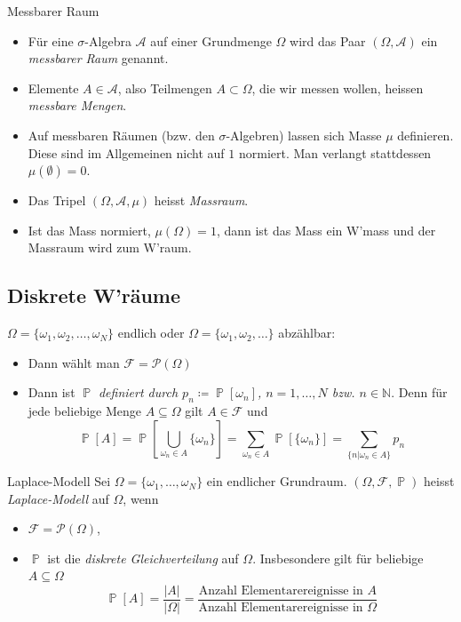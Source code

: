 \documentclass[a4paper,10pt]{article}
\def\N{\mathbb{N}}
\def\F{\mathcal{F}}
\renewcommand{\P}{\operatorname{\mathbb{P}}}
\numberwithin{equation}{section}
\begin{document}
\begin{subbox}{Messbarer Raum}
    \begin{itemize}
        \item Für eine \( \sigma \)-Algebra \( \mathcal{A} \) auf einer Grundmenge \( \Omega \) wird das Paar \( (\Omega, \mathcal{A}) \) ein \emph{messbarer Raum} genannt.
        \item Elemente \( A \in \mathcal{A} \), also Teilmengen \( A \subset \Omega \), die wir messen wollen, heissen \emph{messbare Mengen}.
        \item Auf messbaren Räumen (bzw. den \( \sigma \)-Algebren) lassen sich Masse \( \mu \) definieren. Diese sind im Allgemeinen nicht auf \( 1 \) normiert. Man verlangt stattdessen \( \mu(\emptyset) = 0 \).
        \item Das Tripel \( (\Omega, \mathcal{A}, \mu) \) heisst \emph{Massraum}.
        \item Ist das Mass normiert, \( \mu(\Omega) = 1 \), dann ist das Mass ein W'mass und der Massraum wird zum W'raum.
    \end{itemize}
\end{subbox}

\subsection{Diskrete W'räume}

\( \Omega = \{ \omega_1, \omega_2, \dots, \omega_N \} \) endlich oder \( \Omega = \{ \omega_1, \omega_2, \dots \} \) abzählbar:
\begin{itemize}
    \item Dann wählt man \( \F = \mathcal{P}(\Omega) \)
    \item Dann ist \emph{\( \P \) definiert durch \( p_n \coloneqq \P [\omega_n] \), \( n = 1, \dots, N \) bzw. \( n \in \N \)}. Denn für jede beliebige Menge \( A \subseteq \Omega \) gilt \( A \in \F \) und
    \[
        \P[A] = \P \left[ \bigcup_{\omega_n \in A} \{ \omega_n \} \right] = \sum_{\omega_n \in A} \P [\{\omega_n\}] = \sum_{\{n | \omega_n \in A\}} p_n
    \]
\end{itemize}

\begin{mainbox}{Laplace-Modell}
    Sei \( \Omega = \{ \omega_1, \dots, \omega_N\} \) ein endlicher Grundraum. \( (\Omega, \F, \P) \) heisst \emph{Laplace-Modell} auf \( \Omega \), wenn
    \begin{itemize}
        \item \( \F = \mathcal{P}(\Omega) \),
        \item \( \P \) ist die \emph{diskrete Gleichverteilung} auf \( \Omega \). Insbesondere gilt für beliebige \( A \subseteq \Omega \)
        \[
            \P[A] = \frac{|A|}{|\Omega|} = \frac{\text{Anzahl Elementarereignisse in \(A\)}}{\text{Anzahl Elementarereignisse in \(\Omega\)}}
        \]
    \end{itemize}
\end{mainbox}
\end{document}
